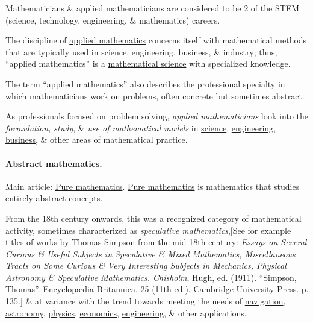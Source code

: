 \documentclass{article}
\begin{document}
Mathematicians \& applied mathematicians are considered to be 2 of the STEM (science, technology, engineering, \& mathematics) careers.

%
The discipline of \href{https://en.wikipedia.org/wiki/Applied_mathematics}{applied mathematics} concerns itself with mathematical methods that are typically used in science, engineering, business, \& industry; thus, ``applied mathematics'' is a \href{https://en.wikipedia.org/wiki/Mathematical_science}{mathematical science} with specialized knowledge.

The term ``applied mathematics'' also describes the professional specialty in which mathematicians work on problems, often concrete but sometimes abstract.

As professionals focused on problem solving, \textit{applied mathematicians} look into the \textit{formulation, study}, \& \textit{use of mathematical models} in \href{https://en.wikipedia.org/wiki/Science}{science}, \href{https://en.wikipedia.org/wiki/Engineering}{engineering}, \href{https://en.wikipedia.org/wiki/Business}{business}, \& other areas of mathematical practice.

\paragraph{Abstract mathematics.} Main article: \href{https://en.wikipedia.org/wiki/Pure_mathematics}{Pure mathematics}. \href{https://en.wikipedia.org/wiki/Pure_mathematics}{Pure mathematics} is mathematics that studies entirely abstract \href{https://en.wikipedia.org/wiki/Concept}{concepts}.

From the 18th century onwards, this was a recognized category of mathematical activity, sometimes characterized as \textit{speculative mathematics},[See for example titles of works by Thomas Simpson from the mid-18th century: \textit{Essays on Several Curious \& Useful Subjects in Speculative \& Mixed Mathematics, Miscellaneous Tracts on Some Curious \& Very Interesting Subjects in Mechanics, Physical Astronomy \& Speculative Mathematics. Chisholm}, Hugh, ed. (1911). ``Simpson, Thomas''. Encyclop\ae dia Britannica. 25 (11th ed.). Cambridge University Press. p. 135.] \& at variance with the trend towards meeting the needs of \href{https://en.wikipedia.org/wiki/Navigation}{navigation}, \href{https://en.wikipedia.org/wiki/Astronomy}{astronomy}, \href{https://en.wikipedia.org/wiki/Physics}{physics}, \href{https://en.wikipedia.org/wiki/Economics}{economics}, \href{https://en.wikipedia.org/wiki/Engineering}{engineering}, \& other applications.
\end{document}
